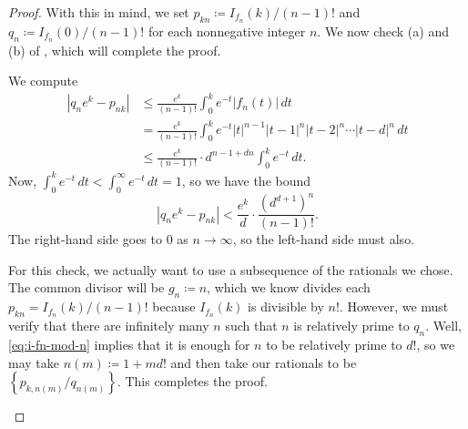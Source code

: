 \documentclass[../notes.tex]{subfiles}
\begin{document}
\begin{proof}
	With this in mind, we set $p_{kn}\coloneqq I_{f_n}(k)/(n-1)!$ and $q_n\coloneqq I_{f_n}(0)/(n-1)!$ for each nonnegative integer $n$. We now check (a) and (b) of , which will complete the proof.
	\begin{listalph}
		\item We compute
		\begin{align*}
			\left|q_ne^k-p_{nk}\right| &\le \frac{e^k}{(n-1)!}\int_0^ke^{-t}\left|f_n(t)\right|\,dt \\
			&= \frac{e^k}{(n-1)!}\int_0^ke^{-t}\left|t\right|^{n-1}\left|t-1\right|^n\left|t-2\right|^n\cdots\left|t-d\right|^n\,dt \\
			&\le \frac{e^k}{(n-1)!}\cdot d^{n-1+dn}\int_0^ke^{-t}\,dt.
		\end{align*}
		Now, $\int_0^ke^{-t}\,dt<\int_0^\infty e^{-t}\,dt=1$, so we have the bound
		\[\left|q_ne^k-p_{nk}\right|<\frac{e^k}d\cdot\frac{\left(d^{d+1}\right)^n}{(n-1)!}.\]
		The right-hand side goes to $0$ as $n\to\infty$, so the left-hand side must also.
		\item For this check, we actually want to use a subsequence of the rationals we chose. The common divisor will be $g_n\coloneqq n$, which we know divides each $p_{kn}=I_{f_n}(k)/(n-1)!$ because $I_{f_n}(k)$ is divisible by $n!$. However, we must verify that there are infinitely many $n$ such that $n$ is relatively prime to $q_n$. Well, \eqref{eq:i-fn-mod-n} implies that it is enough for $n$ to be relatively prime to $d!$, so we may take $n(m)\coloneqq1+md!$ and then take our rationals to be $\left\{p_{k,n(m)}/q_{n(m)}\right\}$. This completes the proof.
		\qedhere 
	\end{listalph}
\end{proof}
\end{document}
